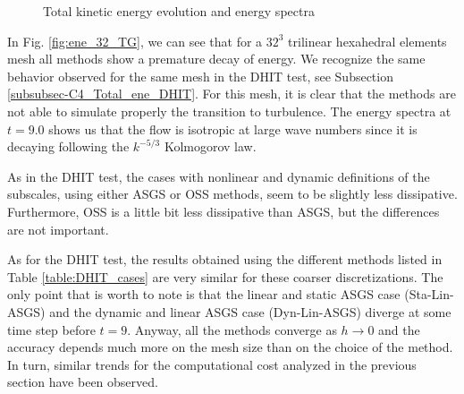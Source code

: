   \begin{figure}[h!]
 	\centering	
 	\caption{Total kinetic energy evolution and energy spectra}
 	\label{fig:ene_spec_32_TG}
 \end{figure}

In Fig. \ref{fig:ene_32_TG}, we can see that for a $32^3$ trilinear hexahedral elements mesh all methods show a premature decay of energy. We recognize the same behavior observed for the same mesh in the DHIT test, see Subsection \ref{subsubsec-C4_Total_ene_DHIT}. For this mesh, it is clear that the methods are not able to simulate properly the transition to turbulence. The energy spectra at $t=9.0$ shows us that the flow is isotropic at large wave numbers since it is decaying following the $k^{-5/3}$ Kolmogorov law. 

As in the DHIT test, the cases with nonlinear and dynamic definitions of the subscales, using either ASGS or OSS methods, seem to be slightly less dissipative. Furthermore, OSS is a little bit less dissipative than ASGS, but the differences are not important. 

As for the DHIT test, the results obtained using the different methods listed in Table \ref{table:DHIT_cases} are very similar for these coarser discretizations. The only point that is worth to note is that the linear and static ASGS case (Sta-Lin-ASGS) and the dynamic and linear ASGS case (Dyn-Lin-ASGS) diverge at some time step before $t=9$. Anyway, all the methods converge as $h\rightarrow0$ and the accuracy depends much more on the mesh size than on the choice of the method. In turn, similar trends for the computational cost analyzed in the previous section have been observed.

